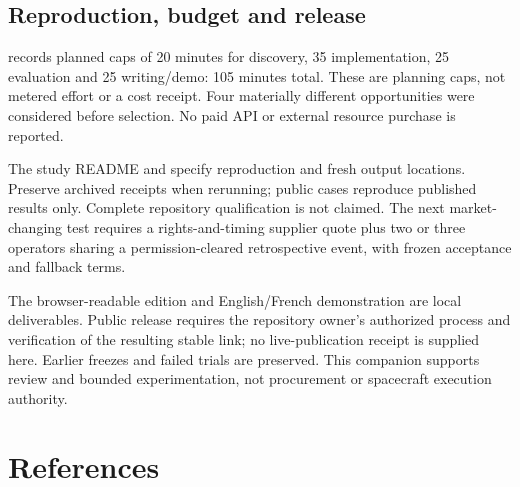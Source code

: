 \documentclass[11pt,letterpaper]{article}
\begin{document}
\hypertarget{reproduction-budget-and-release}{%
\subsection{Reproduction, budget and
release}\label{reproduction-budget-and-release}}

 records planned caps of 20 minutes for
discovery, 35 implementation, 25 evaluation and 25 writing/demo: 105
minutes total. These are planning caps, not metered effort or a cost
receipt. Four materially different opportunities were considered before
selection. No paid API or external resource purchase is reported.

The study README and  specify reproduction
and fresh output locations. Preserve archived receipts when rerunning;
public cases reproduce published results only. Complete repository
qualification is not claimed. The next market-changing test requires a
rights-and-timing supplier quote plus two or three operators sharing a
permission-cleared retrospective event, with frozen acceptance and
fallback terms.

The browser-readable edition and English/French demonstration are local
deliverables. Public release requires the repository owner's authorized
process and verification of the resulting stable link; no
live-publication receipt is supplied here. Earlier freezes and failed
trials are preserved. This companion supports review and bounded
experimentation, not procurement or spacecraft execution authority.

\hypertarget{bibliography}{%
\section*{References}\label{bibliography}}
\end{document}
